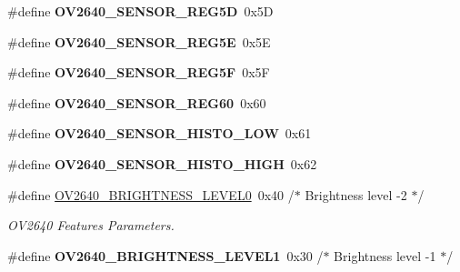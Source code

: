 \begin{DoxyCompactItemize}
\#define {\bfseries O\+V2640\+\_\+\+S\+E\+N\+S\+O\+R\+\_\+\+R\+E\+G5D}~0x5D
\item 
\mbox{\label{group___o_v2640___exported___constants_gadbcb60e6f49804586695fc6ca94926fa}} 
\#define {\bfseries O\+V2640\+\_\+\+S\+E\+N\+S\+O\+R\+\_\+\+R\+E\+G5E}~0x5E
\item 
\mbox{\label{group___o_v2640___exported___constants_ga0546bd28f265dd1b11003109d3e96557}} 
\#define {\bfseries O\+V2640\+\_\+\+S\+E\+N\+S\+O\+R\+\_\+\+R\+E\+G5F}~0x5F
\item 
\mbox{\label{group___o_v2640___exported___constants_ga160a9eff60c81f8353636b66f57ebb5d}} 
\#define {\bfseries O\+V2640\+\_\+\+S\+E\+N\+S\+O\+R\+\_\+\+R\+E\+G60}~0x60
\item 
\mbox{\label{group___o_v2640___exported___constants_ga032aeca58c4006d506516dca5595ed32}} 
\#define {\bfseries O\+V2640\+\_\+\+S\+E\+N\+S\+O\+R\+\_\+\+H\+I\+S\+T\+O\+\_\+\+L\+OW}~0x61
\item 
\mbox{\label{group___o_v2640___exported___constants_gaa29282a5b942c8aa02e6d10518ed5726}} 
\#define {\bfseries O\+V2640\+\_\+\+S\+E\+N\+S\+O\+R\+\_\+\+H\+I\+S\+T\+O\+\_\+\+H\+I\+GH}~0x62
\item 
\mbox{\label{group___o_v2640___exported___constants_ga1062a6a9f12edaa4965e31c8a4559724}} 
\#define \hyperlink{group___o_v2640___exported___constants_ga1062a6a9f12edaa4965e31c8a4559724}{O\+V2640\+\_\+\+B\+R\+I\+G\+H\+T\+N\+E\+S\+S\+\_\+\+L\+E\+V\+E\+L0}~0x40   /$\ast$ Brightness level -\/2         $\ast$/
\begin{DoxyCompactList}\small\item\em O\+V2640 Features Parameters. \end{DoxyCompactList}\item 
\mbox{\label{group___o_v2640___exported___constants_ga885acf8272559a1fd37dbb5d00e3371f}} 
\#define {\bfseries O\+V2640\+\_\+\+B\+R\+I\+G\+H\+T\+N\+E\+S\+S\+\_\+\+L\+E\+V\+E\+L1}~0x30   /$\ast$ Brightness level -\/1         $\ast$/

\end{DoxyCompactItemize}
